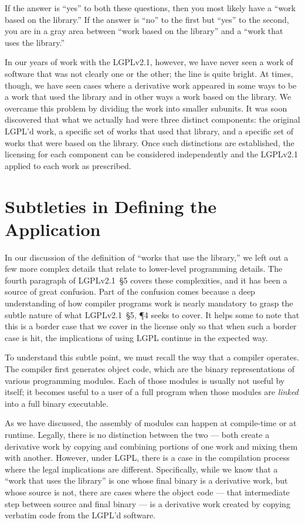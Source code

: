 If the answer is ``yes'' to both these questions, then you most likely
have a ``work based on the library.''  If the answer is ``no'' to the
first but ``yes'' to the second, you are in a gray area between ``work
based on the library'' and a ``work that uses the library.''

In our years of work with the LGPLv2.1, however, we have never seen a work
of software that was not clearly one or the other; the line is quite
bright. At times, though, we have seen cases where a derivative work
appeared in some ways to be a work that used the library and in other
ways a work based on the library. We overcame this problem by
dividing the work into smaller subunits. It was soon discovered that
what we actually had were three distinct components: the original
LGPL'd work, a specific set of works that used that library, and a
specific set of works that were based on the library. Once such
distinctions are established, the licensing for each component can be
considered independently and the LGPLv2.1 applied to each work as
prescribed.


\section{Subtleties in Defining the Application}

In our discussion of the definition of ``works that use the library,'' we
left out a few more complex details that relate to lower-level programming
details. The fourth paragraph of LGPLv2.1~\S5 covers these complexities,
and it has been a source of great confusion. Part of the confusion comes
because a deep understanding of how compiler programs work is nearly
mandatory to grasp the subtle nature of what LGPLv2.1~\S5, \P 4 seeks to
cover. It helps some to note that this is a border case that we cover in
the license only so that when such a border case is hit, the implications
of using LGPL continue in the expected way.

To understand this subtle point, we must recall the way that a compiler
operates. The compiler first generates object code, which are the binary
representations of various programming modules. Each of those modules is
usually not useful by itself; it becomes useful to a user of a full program
when those modules are {\em linked\/} into a full binary executable.

As we have discussed, the assembly of modules can happen at compile-time
or at runtime. Legally, there is no distinction between the two --- both
create a derivative work by copying and combining portions of one work and
mixing them with another. However, under LGPL, there is a case in the
compilation process where the legal implications are different.
Specifically, while we know that a ``work that uses the library'' is one
whose final binary is a derivative work, but whose source is not, there
are cases where the object code --- that intermediate step between source
and final binary --- is a derivative work created by copying verbatim code
from the LGPL'd software.

